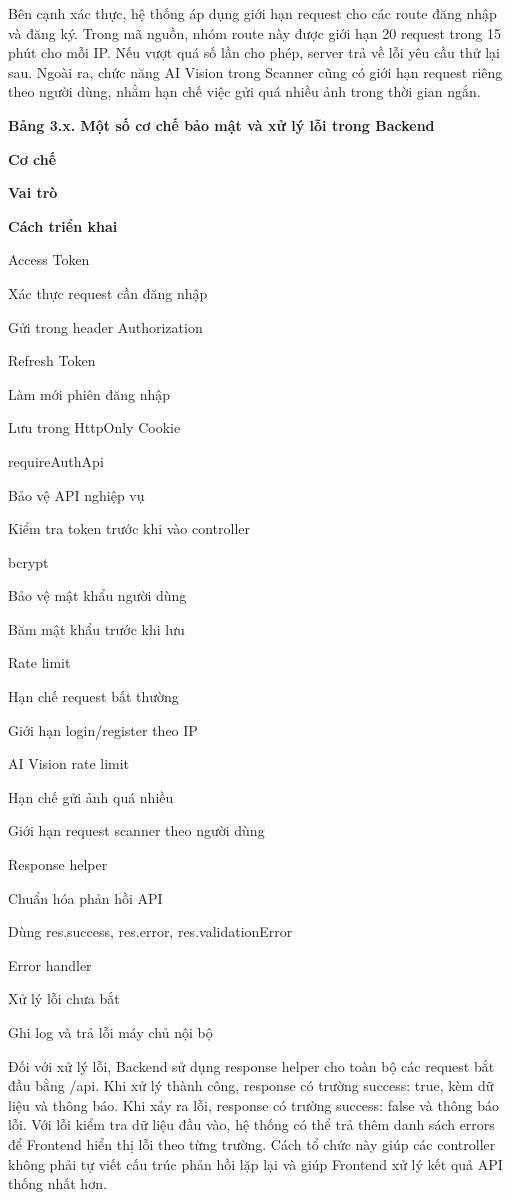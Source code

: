 \documentclass[12pt, a4paper]{report}
\begin{document}
Bên cạnh xác thực, hệ thống áp dụng giới hạn request cho các route đăng nhập và đăng ký. Trong mã nguồn, nhóm route này được giới hạn 20 request trong 15 phút cho mỗi IP. Nếu vượt quá số lần cho phép, server trả về lỗi yêu cầu thử lại sau. Ngoài ra, chức năng AI Vision trong Scanner cũng có giới hạn request riêng theo người dùng, nhằm hạn chế việc gửi quá nhiều ảnh trong thời gian ngắn.

\textbf{Bảng 3.x. Một số cơ chế bảo mật và xử lý lỗi trong Backend}

\textbf{Cơ chế}

\textbf{Vai trò}

\textbf{Cách triển khai}

Access Token

Xác thực request cần đăng nhập

Gửi trong header Authorization

Refresh Token

Làm mới phiên đăng nhập

Lưu trong HttpOnly Cookie

requireAuthApi

Bảo vệ API nghiệp vụ

Kiểm tra token trước khi vào controller

bcrypt

Bảo vệ mật khẩu người dùng

Băm mật khẩu trước khi lưu

Rate limit

Hạn chế request bất thường

Giới hạn login/register theo IP

AI Vision rate limit

Hạn chế gửi ảnh quá nhiều

Giới hạn request scanner theo người dùng

Response helper

Chuẩn hóa phản hồi API

Dùng res.success, res.error, res.validationError

Error handler

Xử lý lỗi chưa bắt

Ghi log và trả lỗi máy chủ nội bộ

Đối với xử lý lỗi, Backend sử dụng response helper cho toàn bộ các request bắt đầu bằng /api. Khi xử lý thành công, response có trường success: true, kèm dữ liệu và thông báo. Khi xảy ra lỗi, response có trường success: false và thông báo lỗi. Với lỗi kiểm tra dữ liệu đầu vào, hệ thống có thể trả thêm danh sách errors để Frontend hiển thị lỗi theo từng trường. Cách tổ chức này giúp các controller không phải tự viết cấu trúc phản hồi lặp lại và giúp Frontend xử lý kết quả API thống nhất hơn.
\end{document}
